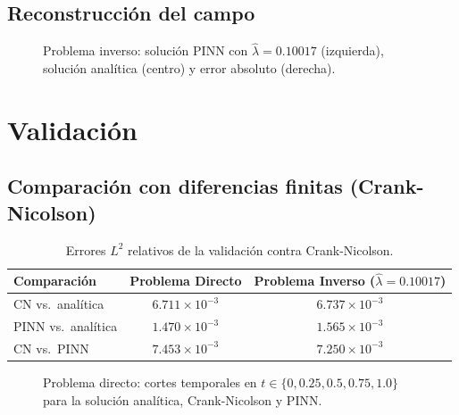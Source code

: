 \documentclass[12pt,a4paper]{article}
\newcommand{\lhat}{\hat{\lambda}}
\begin{document}
\subsection{Reconstrucción del campo}

\begin{figure}[H]
  \centering
  \caption{Problema inverso: solución PINN con $\lhat=0.10017$ (izquierda), solución
           analítica (centro) y error absoluto (derecha).}
  \label{fig:sol_inverso}
\end{figure}

\section{Validación}

\subsection{Comparación con diferencias finitas (Crank-Nicolson)}

\begin{table}[H]
  \centering
  \caption{Errores $L^2$ relativos de la validación contra Crank-Nicolson.}\label{tab:cn}
  \begin{tabular}{lcc}\toprule
    Comparación & Problema Directo & Problema Inverso ($\lhat=0.10017$)\\\midrule
    CN vs.\ analítica   & $6.711\times10^{-3}$ & $6.737\times10^{-3}$\\
    PINN vs.\ analítica & $1.470\times10^{-3}$ & $1.565\times10^{-3}$\\
    CN vs.\ PINN        & $7.453\times10^{-3}$ & $7.250\times10^{-3}$\\\bottomrule
  \end{tabular}
\end{table}

\begin{figure}[H]
  \centering
  \caption{Problema directo: cortes temporales en $t\in\{0,0.25,0.5,0.75,1.0\}$
           para la solución analítica, Crank-Nicolson y PINN.}
  \label{fig:cn_directo}
\end{figure}
\end{document}
